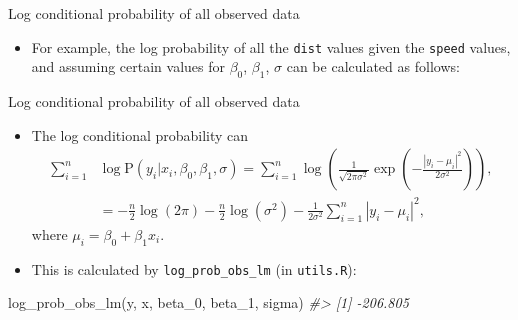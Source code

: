 \documentclass[
  10pt,
  ignorenonframetext,
]{beamer}
\newenvironment{Shaded}{\begin{snugshade}}{\end{snugshade}}
\newcommand{\AttributeTok}[1]{\textcolor[rgb]{0.77,0.63,0.00}{#1}}
\newcommand{\CommentTok}[1]{\textcolor[rgb]{0.56,0.35,0.01}{\textit{#1}}}
\newcommand{\ConstantTok}[1]{\textcolor[rgb]{0.00,0.00,0.00}{#1}}
\newcommand{\DecValTok}[1]{\textcolor[rgb]{0.00,0.00,0.81}{#1}}
\newcommand{\FunctionTok}[1]{\textcolor[rgb]{0.00,0.00,0.00}{#1}}
\newcommand{\NormalTok}[1]{#1}
\newcommand{\OtherTok}[1]{\textcolor[rgb]{0.56,0.35,0.01}{#1}}
\newcommand{\SpecialCharTok}[1]{\textcolor[rgb]{0.00,0.00,0.00}{#1}}
\providecommand{\tightlist}{%
  \setlength{\itemsep}{0pt}\setlength{\parskip}{0pt}}
\newcommand{\Prob}[1]{\mathrm{P}( #1 )}
\newcommand*{\given}{\vert}
\begin{document}
\begin{frame}[fragile]{Log conditional probability of all observed data}
\protect\hypertarget{log-conditional-probability-of-all-observed-data}{}
\begin{itemize}
\tightlist
\item
  For example, the log probability of all the \texttt{dist} values given
  the \texttt{speed} values, and assuming certain values for
  \(\beta_0\), \(\beta_1\), \(\sigma\) can be calculated as follows:
\end{itemize}

\begin{Shaded}
\end{Shaded}
\end{frame}

\begin{frame}[fragile]{Log conditional probability of all observed data}
\protect\hypertarget{log-conditional-probability-of-all-observed-data-1}{}
\begin{itemize}
\item
  The log conditional probability can \[
  \begin{aligned}
  \sum_{i=1}^n &\log \Prob{y_i \given x_i, \beta_0, \beta_1, \sigma} =
  \sum_{i=1}^n \log\left( \frac{1}{\sqrt{2\pi\sigma^2}} \exp{\left(-\frac{|y_i - \mu_i|^2}{2\sigma^2}\right)} \right),\\
  &= -\frac{n}{2} \log\left(2\pi\right) -\frac{n}{2} \log(\sigma^2) -\frac{1}{2\sigma^2} \sum_{i=1}^n |y_i - \mu_i|^2,
  \end{aligned}
  \] where \(\mu_i = \beta_0 + \beta_1 x_i\).
\item
  This is calculated by \texttt{log\_prob\_obs\_lm} (in
  \texttt{utils.R}):
\end{itemize}

\begin{Shaded}
\begin{Highlighting}[]
\FunctionTok{log\_prob\_obs\_lm}\NormalTok{(y, x, beta\_0, beta\_1, sigma)}
\CommentTok{\#\textgreater{} [1] {-}206.805}
\end{Highlighting}
\end{Shaded}
\end{frame}
\end{document}
